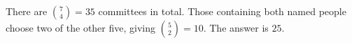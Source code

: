 There are $\binom74=35$ committees in total. Those containing both named people choose two of the other five, giving $\binom52=10$. The answer is $\boxed{25}$.
